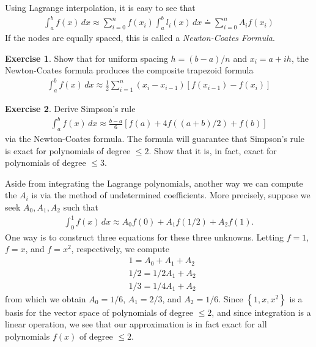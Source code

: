 \documentclass[12pt]{article}
\theoremstyle{plain}
\theoremstyle{definition}
\newtheorem*{exercise}{Exercise}
\theoremstyle{remark}
\numberwithin{equation}{section}  %
\begin{document}
Using Lagrange interpolation, it is easy to see that
\begin{align*}
\int_a^b f(x)\, dx \approx \sum_{i=0}^n f(x_i)\int_a^b l_i(x)\, dx 
\doteq \sum_{i=0}^n A_i f(x_i)
\end{align*}
If the nodes are equally spaced, this is called a \emph{Newton-Coates Formula}.
\begin{exercise}
Show that for uniform spacing $h = (b-a)/n$ and $x_i = a + ih$,
the Newton-Coates formula produces the composite trapezoid formula
\begin{align*}
\int_a^b f(x) \, dx \approx \frac{1}{2}\sum_{i=1}^n
(x_i - x_{i-1})[f(x_{i-1}) - f(x_i)]
\end{align*}
\end{exercise}
\begin{exercise}
Derive Simpson's rule
\begin{align*}
\int_a^b f(x)\, dx \approx \frac{b-a}{6} \left [f(a) + 4f((a+b)/2) + f(b) \right]	
\end{align*}
via the Newton-Coates formula. The formula will guarantee that
Simpson's rule is exact for polynomials of degree $\le 2$. Show that it is,
in fact, exact for polynomials of degree $\le 3$.
\end{exercise}
Aside from integrating the Lagrange polynomials, another way we can
compute the $A_i$ is via the method of undetermined coefficients. More precisely,
suppose we seek $A_0, A_1, A_2$ such that
\begin{align*}
\int_0^1 f(x) \, dx \approx A_0 f(0) + A_1 f(1/2) + A_2 f(1).
\end{align*}
One way is to construct three equations for these three unknowns.
Letting $f = 1$, $f = x$, and $f = x^2$, respectively, we compute
\begin{align*}
& 1 = A_0 + A_1 + A_2
\\
& 1/2 = 1/2A_1 + A_2
\\
& 1/3 = 1/4A_1 + A_2
\end{align*}
from which we obtain $A_0 = 1/6$, $A_1 = 2/3$, and $A_2 = 1/6$.
Since $ \left\{ 1, x, x^2 \right\} $ is a basis for the vector space of 
polynomials of degree $\le 2$, and since integration is a linear operation, we see that our approximation is in fact exact
for all polynomials $f(x)$ of degree $\le 2$.
\end{document}

